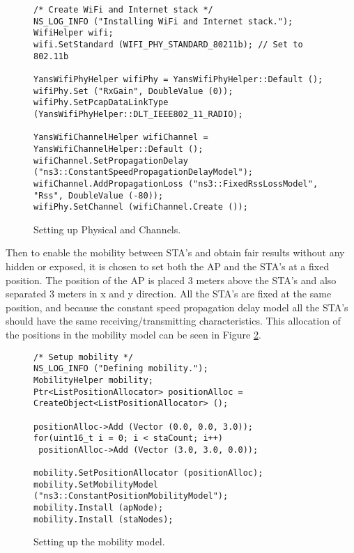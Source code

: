\documentclass[]{article}
\begin{document}
\begin{figure}[H]
\begin{lstlisting}[frame=bt]
/* Create WiFi and Internet stack */
NS_LOG_INFO ("Installing WiFi and Internet stack.");
WifiHelper wifi;
wifi.SetStandard (WIFI_PHY_STANDARD_80211b); // Set to 802.11b

YansWifiPhyHelper wifiPhy = YansWifiPhyHelper::Default ();
wifiPhy.Set ("RxGain", DoubleValue (0));
wifiPhy.SetPcapDataLinkType (YansWifiPhyHelper::DLT_IEEE802_11_RADIO);

YansWifiChannelHelper wifiChannel = YansWifiChannelHelper::Default ();
wifiChannel.SetPropagationDelay ("ns3::ConstantSpeedPropagationDelayModel");
wifiChannel.AddPropagationLoss ("ns3::FixedRssLossModel", "Rss", DoubleValue (-80));
wifiPhy.SetChannel (wifiChannel.Create ());
\end{lstlisting}
\caption{Setting up Physical and Channels.\label{fig:wifi_stack}}
\end{figure}

Then to enable the mobility between STA's and obtain fair results without any hidden or exposed, it is chosen to set both the AP and the STA's at a fixed position.
The position of the AP is placed 3 meters above the STA's and also separated 3 meters in x and y direction.
All the STA's are fixed at the same position, and because the constant speed propagation delay model all the STA's should have the same receiving/transmitting characteristics.
This allocation of the positions in the mobility model can be seen in Figure \ref{fig:mobility}.

\begin{figure}[H]
\begin{lstlisting}[frame=bt]
/* Setup mobility */
NS_LOG_INFO ("Defining mobility.");
MobilityHelper mobility;
Ptr<ListPositionAllocator> positionAlloc = CreateObject<ListPositionAllocator> ();

positionAlloc->Add (Vector (0.0, 0.0, 3.0));
for(uint16_t i = 0; i < staCount; i++)
 positionAlloc->Add (Vector (3.0, 3.0, 0.0));

mobility.SetPositionAllocator (positionAlloc);
mobility.SetMobilityModel ("ns3::ConstantPositionMobilityModel");
mobility.Install (apNode);
mobility.Install (staNodes);
\end{lstlisting}
\caption{Setting up the mobility model.\label{fig:mobility}}
\end{figure}
\end{document}
